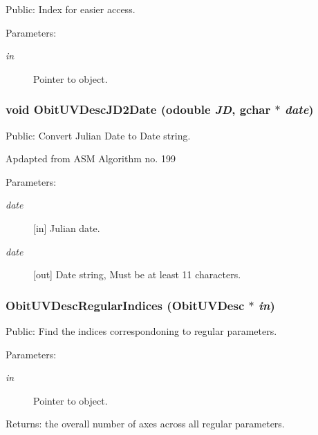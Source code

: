 Public: Index for easier access. 

\begin{Desc}
\item[Parameters:]
\begin{description}
\item[{\em in}]Pointer to object. \end{description}
\end{Desc}
\subsubsection{\setlength{\rightskip}{0pt plus 5cm}void Obit\-UVDesc\-JD2Date ({\bf odouble} {\em JD}, gchar $\ast$ {\em date})}\label{ObitUVDesc_8h_a17}


Public: Convert Julian Date to Date string. 

Apdapted from ASM Algorithm no. 199 \begin{Desc}
\item[Parameters:]
\begin{description}
\item[{\em date}][in] Julian date. \item[{\em date}][out] Date string, Must be at least 11 characters. \end{description}
\end{Desc}
\subsubsection{ Obit\-UVDesc\-Regular\-Indices ({\bf Obit\-UVDesc} $\ast$ {\em in})}\label{ObitUVDesc_8h_a14}


Public: Find the indices correspondoning to regular parameters. 

\begin{Desc}
\item[Parameters:]
\begin{description}
\item[{\em in}]Pointer to object. \end{description}
\end{Desc}
\begin{Desc}
\item[Returns:]the overall number of axes across all regular parameters. \end{Desc}

